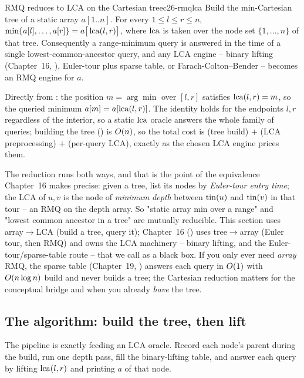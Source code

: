 \begin{theorem}{RMQ reduces to LCA on the Cartesian tree}{c26-rmqlca}
Build the min-Cartesian tree of a static array $a[1..n]$. For every $1 \le l \le r \le n$,
$\min\{a[l],\dots,a[r]\} = a\big[\operatorname{lca}(l,r)\big]$, where $\operatorname{lca}$ is taken over the node set
$\{1,\dots,n\}$ of that tree. Consequently a range-minimum query is answered in the time of a single
lowest-common-ancestor query, and any LCA engine -- binary lifting (Chapter~16, ),
Euler-tour plus sparse table, or Farach-Colton--Bender -- becomes an RMQ engine for $a$.
\end{theorem}
\begin{proofbox}
Directly from : the position $m=\arg\min$ over $[l,r]$ satisfies
$\operatorname{lca}(l,r)=m$, so the queried minimum $a[m]=a[\operatorname{lca}(l,r)]$. The identity holds for the endpoints $l,r$
regardless of the interior, so a static $\operatorname{lca}$ oracle answers the whole family of queries; building the
tree () is $O(n)$, so the total cost is (tree build) $+$ (LCA preprocessing)
$+$ (per-query LCA), exactly as the chosen LCA engine prices them. \end{proofbox}

\begin{notebox}
The reduction runs both ways, and that is the point of the equivalence Chapter~16 makes precise: given a
tree, list its nodes by \emph{Euler-tour entry time}; the LCA of $u,v$ is the node of \emph{minimum depth}
between $\operatorname{tin}(u)$ and $\operatorname{tin}(v)$ in that tour -- an RMQ on the depth array. So "static array min over a
range" and "lowest common ancestor in a tree" are mutually reducible. This section uses
array$\to$LCA (build a tree, query it); Chapter~16 () uses tree$\to$array (Euler tour, then
RMQ) and owns the LCA machinery -- binary lifting, and the Euler-tour/sparse-table route -- that we call
as a black box. If you only ever need \emph{array} RMQ, the sparse table (Chapter~19, ) answers
each query in $O(1)$ with $O(n\log n)$ build and never builds a tree; the Cartesian reduction
matters for the conceptual bridge and when you already \emph{have} the tree.
\end{notebox}

\subsection{The algorithm: build the tree, then lift}

The pipeline is exactly  feeding an LCA oracle. Record each node's parent during
the build, run one depth pass, fill the binary-lifting table, and answer each query by lifting
$\operatorname{lca}(l,r)$ and printing $a$ of that node.

